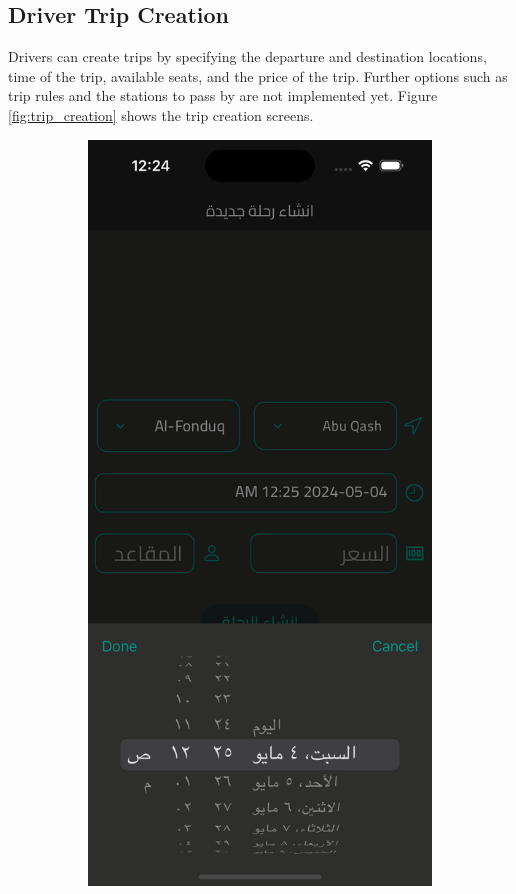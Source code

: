 \documentclass[a4paper, 12pt]{report} %
\begin{document}
        \subsection{Driver Trip Creation}
            Drivers can create trips by specifying the departure and destination locations, time of the trip, available seats, and the price of the trip. Further options such as trip rules and the stations to pass by are not implemented yet. Figure \ref{fig:trip_creation} shows the trip creation screens.
            \begin{figure}[H]
                \centering
                \begin{subfigure}{0.3\textwidth}
                    \includegraphics[width=\linewidth]{Images/trip_creation_1.png}

\end{subfigure}
\end{figure}
\end{document}
